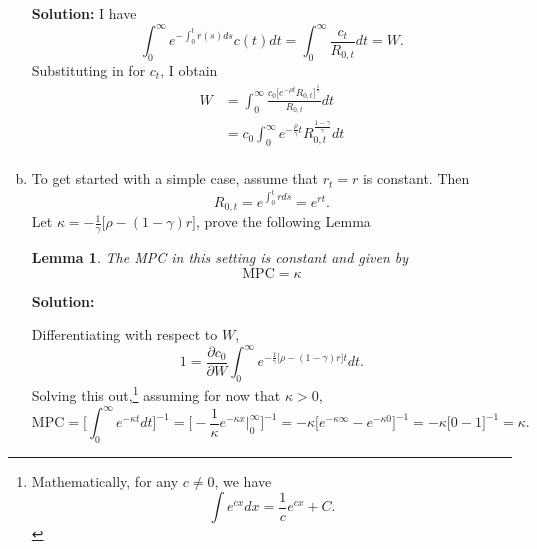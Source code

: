 \documentclass[11pt]{extarticle}
\theoremstyle{plain}
\newtheorem{lem}[thm]{Lemma}
\theoremstyle{definition}
\begin{document}
\begin{enumerate}[(a)]
\textbf{Solution:}
I have
\begin{equation*}
	\int_0^\infty e^{- \int_0^t r(s) ds }   c(t) dt = \int_0^\infty \frac{c_t}{R_{0,t}} dt = W.
\end{equation*}
Substituting in for $c_t$, I obtain
\begin{align*}
	W &= \int_0^\infty \frac{c_0 \big[ e^{- \rho t} R_{0,t} \big]^\frac{1}{\gamma} }{R_{0,t}} dt \\
	&= c_0 \int_0^\infty e^{- \frac{\rho}{\gamma} t} R_{0,t}^\frac{1-\gamma}{\gamma} dt \\
\end{align*}


\item To get started with a simple case, assume that $r_t = r$ is constant. Then 
\begin{equation*}
	R_{0,t} = e^{\int_0^t r ds } = e^{ r t}.
\end{equation*}
Let $\kappa =- \frac{1}{\gamma} \big[ \rho - (1-\gamma) r \big] $, prove the following Lemma

\vspace{3mm}
\noindent
\begin{lem}
	The MPC in this setting is constant and given by
	\begin{equation*}
		\text{MPC} = \kappa
	\end{equation*}
	
\end{lem}


\textbf{Solution:}

Differentiating with respect to $W$, 
\begin{equation*}
	1 = \frac{\partial c_0}{\partial W} \int_0^\infty e^{- \frac{1}{\gamma} \big[ \rho - (1-\gamma) r \big] t }  dt.
\end{equation*}
Solving this out,\footnote{
	Mathematically, for any $c \neq 0$, we have 
	\begin{equation*}
		\int e^{c x} dx = \frac{1}{c} e^{cx} + C. 
	\end{equation*}
} assuming for now that $\kappa > 0$, 
\begin{equation*}
	\text{MPC} = \bigg[\int_0^\infty e^{- \kappa t }  dt\bigg]^{-1}  = \bigg[ - \frac{1}{\kappa} e^{- \kappa x}  \bigg|_0^\infty  \bigg]^{-1}  = - \kappa \bigg[e^{- \kappa \infty }  - e^{- \kappa 0}  \bigg]^{-1} = - \kappa \bigg[0 - 1  \bigg]^{-1} = \kappa. 
\end{equation*}


\end{enumerate}
\end{document}
